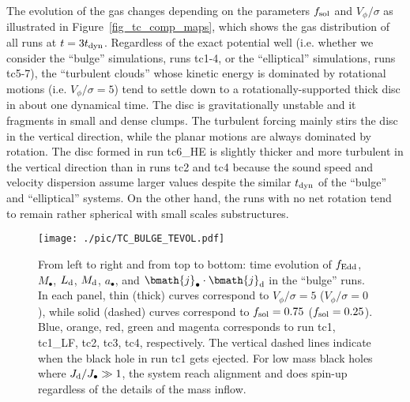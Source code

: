 \documentclass[a4paper,fleqn,usenatbib]{mnras}
\begin{document}
The evolution of the gas changes depending on the parameters $f_{\rm sol}$ and $V_{\phi}/\sigma$ as illustrated in Figure~\ref{fig_tc_comp_maps}, which shows the gas distribution of all runs at $t = 3 t_{\rm dyn}$.
Regardless of the exact potential well (i.e. whether we consider the ``bulge'' simulations, runs tc1-4, or the ``elliptical'' simulations, runs tc5-7), the ``turbulent clouds'' whose kinetic energy is dominated by rotational motions (i.e. $V_{\phi}/\sigma = 5$) tend to settle down to a rotationally-supported thick disc in about one dynamical time.
The disc is gravitationally unstable and it fragments in small and dense clumps.
The turbulent forcing mainly stirs the disc in the vertical direction, while the planar motions are always dominated by rotation.
The disc formed in run tc6\_HE is slightly thicker and more turbulent in the vertical direction than in runs tc2 and tc4 because the sound speed and velocity dispersion assume larger values despite the similar $t_{\rm dyn}$ of the ``bulge'' and ``elliptical'' systems.
On the other hand, the runs with no net rotation tend to remain rather spherical with small scales substructures. 

\begin{figure*}
\begin{center}
\texttt{[image: ./pic/TC\_BULGE\_TEVOL.pdf]}
\caption{From left to right and from top to bottom: time evolution of $f_{\rm Edd}$, $M_{\bullet}$, $L_{\rm d}$, $M_{\rm d}$, $a_{\bullet}$, and $\bmath{j}_{\bullet} \cdot \bmath{j}_{\rm d}$ in the ``bulge'' runs.
In each panel, thin (thick) curves correspond to $V_{\phi}/\sigma=5$ ($V_{\phi}/\sigma=0$), while solid (dashed) curves correspond to $f_{\rm sol}=0.75$ ($f_{\rm sol}=0.25$).
Blue, orange, red, green and magenta corresponds to run tc1, tc1\_LF, tc2, tc3, tc4, respectively.
The vertical dashed lines indicate when the black hole in run tc1 gets ejected. 
For low mass black holes where $J_{\rm d}/J_{\bullet} \gg 1$, the system reach alignment and does spin-up regardless of the details of the mass inflow.
}
\label{fig_tc_bulge_summary}
\end{center}
\end{figure*}
\end{document}
